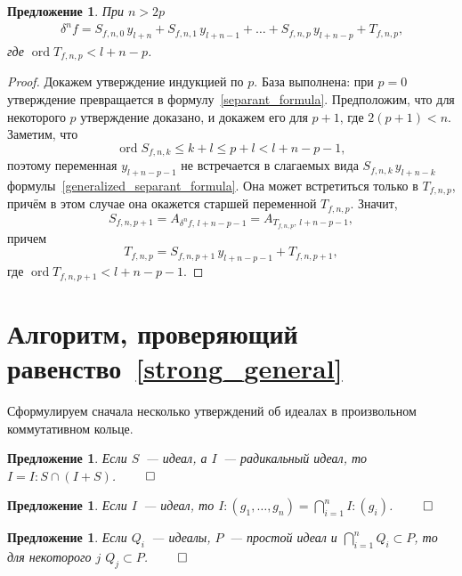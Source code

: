 \documentclass[11pt]{article}
\DeclareMathOperator{\ord}{ord}
\renewcommand{\le}{\leqslant}
\theoremstyle{plain}
\newtheorem{proposition}[theorem1]{Предложение}
\theoremstyle{definition}
\theoremstyle{remark}
\begin{document}
\begin{proposition}
\label{generalized_separants_expansion}
При $n > 2p$
\begin{gather}
\label{generalized_separant_formula}
 \,\delta^n f = S_{f,n,0} \, y_{l+n} + S_{f,n,1} \, y_{l+n-1} + \ldots + S_{f,n,p} \, y_{l+n-p} + T_{f,n,p},
\end{gather}
где $\ord T_{f,n,p} < l+n-p$.
\end{proposition}

\begin{proof}
Докажем утверждение индукцией по $p$.
База выполнена: при $p = 0$ утверждение превращается в формулу~\eqref{separant_formula}.
Предположим, что для некоторого $p$ утверждение доказано, и докажем его для $p + 1$, где $2(p+1) < n$.
Заметим, что 
$$
 \ord S_{f,n,k} \le k + l \le p + l < l+n-p-1,
$$
поэтому переменная $y_{l+n-p-1}$ не встречается в слагаемых вида $S_{f,n,k} \, y_{l+n-k}$ формулы~\eqref{generalized_separant_formula}.
Она может встретиться только в $T_{f,n,p}$, причём в этом случае она окажется старшей переменной $T_{f,n,p}$.
Значит,
$$
 S_{f,n,p+1} = A_{\delta^n f, \, l+n-p-1} = A_{T_{f,n,p}, \, l+n-p-1},
$$
причем 
$$
 T_{f,n,p} = S_{f,n,p+1} \, y_{l+n-p-1} + T_{f,n,p+1},
$$
где $\ord T_{f,n,p+1} < l+n-p-1$.
\end{proof}

\bigskip


\section{Алгоритм, проверяющий равенство~\eqref{strong_general}}
\label{algorithm}

Сформулируем сначала несколько утверждений об идеалах в произвольном коммутативном кольце.

\begin{proposition}
Если $S$~--- идеал, а $I$~--- радикальный идеал, то $I = I:S \cap (I+S)$. $\qed$
\end{proposition}

\begin{proposition}
Если $I$~--- идеал, то $I : (g_1, \ldots, g_n) = \bigcap_{i=1}^n I:(g_i)$. $\qed$
\end{proposition}

\begin{proposition}
\label{Primes}
Если $Q_i$~--- идеалы, $P$~--- простой идеал и $\bigcap_{i=1}^n Q_i \subset P$, то для некоторого $j$ $Q_j \subset P$. $\qed$
\end{proposition}
\end{document}
